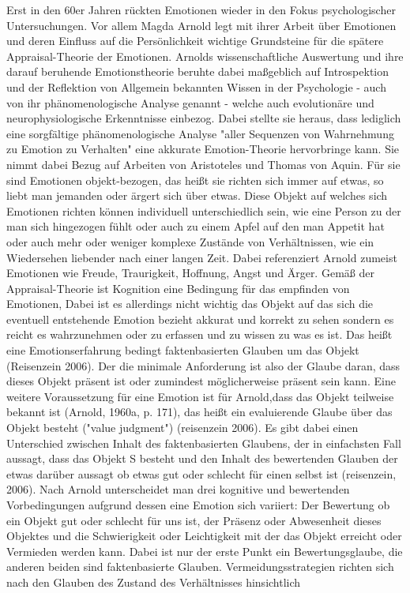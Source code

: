Erst in den 60er Jahren rückten Emotionen wieder in den Fokus psychologischer Untersuchungen. Vor allem Magda Arnold legt mit ihrer Arbeit über Emotionen und deren Einfluss auf die Persönlichkeit wichtige Grundsteine für die spätere Appraisal-Theorie der Emotionen. Arnolds wissenschaftliche Auswertung und ihre darauf beruhende Emotionstheorie beruhte dabei maßgeblich auf Introspektion und der Reflektion von Allgemein bekannten Wissen in der Psychologie - auch von ihr phänomenologische Analyse genannt - welche auch evolutionäre und neurophysiologische Erkenntnisse einbezog. Dabei stellte sie heraus, dass lediglich eine sorgfältige phänomenologische Analyse "aller Sequenzen von Wahrnehmung zu Emotion zu Verhalten" eine akkurate Emotion-Theorie hervorbringe kann. Sie nimmt dabei Bezug auf Arbeiten von Aristoteles und Thomas von Aquin. Für sie sind Emotionen objekt-bezogen, das heißt sie richten sich immer auf etwas, so liebt man jemanden oder ärgert sich über etwas. Diese Objekt auf welches sich Emotionen richten können individuell unterschiedlich sein, wie eine Person zu der man sich hingezogen fühlt oder auch zu einem Apfel auf den man Appetit hat oder auch mehr oder weniger komplexe Zustände von Verhältnissen, wie ein Wiedersehen liebender nach einer langen Zeit. 
Dabei referenziert Arnold zumeist Emotionen wie Freude, Traurigkeit, Hoffnung, Angst und Ärger. 
Gemäß der Appraisal-Theorie ist Kognition eine Bedingung für das empfinden von Emotionen, Dabei ist es allerdings nicht wichtig das Objekt auf das sich die eventuell entstehende Emotion bezieht akkurat und korrekt zu sehen sondern es reicht es wahrzunehmen oder zu erfassen und zu wissen zu was es ist.  
Das heißt eine Emotionserfahrung bedingt faktenbasierten Glauben um das Objekt (Reisenzein 2006). Der die minimale Anforderung ist also der Glaube daran, dass dieses Objekt präsent ist oder zumindest möglicherweise präsent sein kann. 
Eine weitere Voraussetzung für eine Emotion ist für Arnold,dass das Objekt teilweise bekannt ist (Arnold, 1960a, p.  171), das heißt ein evaluierende Glaube über das Objekt besteht ("value judgment") (reisenzein 2006). Es gibt dabei einen Unterschied zwischen Inhalt des faktenbasierten Glaubens, der in einfachsten Fall aussagt, dass das Objekt S besteht und den Inhalt des bewertenden Glauben der etwas darüber aussagt ob etwas gut oder schlecht für einen selbst ist (reisenzein, 2006). Nach Arnold unterscheidet man drei kognitive und bewertenden Vorbedingungen aufgrund dessen eine Emotion sich variiert: Der Bewertung ob ein Objekt gut oder schlecht für uns ist, der Präsenz oder Abwesenheit dieses Objektes und die Schwierigkeit oder Leichtigkeit mit der das Objekt erreicht oder Vermieden werden kann. Dabei ist nur der erste Punkt ein Bewertungsglaube, die anderen beiden sind faktenbasierte Glauben. Vermeidungsstrategien richten sich nach den Glauben des Zustand des Verhältnisses hinsichtlich 
